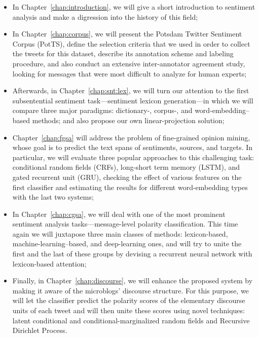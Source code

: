 \begin{itemize}
\item In Chapter~\ref{chap:introduction}, we will give a short
  introduction to sentiment analysis and make a digression into the
  history of this field;

\item In Chapter~\ref{chap:corpus}, we will present the Potsdam
  Twitter Sentiment Corpus (PotTS), define the selection criteria that
  we used in order to collect the tweets for this dataset, describe
  its annotation scheme and labeling procedure, and also conduct an
  extensive inter-annotator agreement study, looking for messages that
  were most difficult to analyze for human experts;

\item Afterwards, in Chapter~\ref{chap:snt:lex}, we will turn our
  attention to the first subsentential sentiment task---sentiment
  lexicon generation---in which we will compare three major paradigms:
  dictionary-, corpus-, and word-embedding--based methods; and also
  propose our own linear-projection solution;

\item Chapter~\ref{chap:fgsa} will address the problem of fine-grained
  opinion mining, whose goal is to predict the text spans of
  sentiments, sources, and targets.  In particular, we will evaluate
  three popular approaches to this challenging task: conditional
  random fields (CRFs), long-short term memory (LSTM), and gated
  recurrent unit (GRU), checking the effect of various features on the
  first classifier and estimating the results for different
  word-embedding types with the last two systems;

\item In Chapter~\ref{chap:cgsa}, we will deal with one of the most
  prominent sentiment analysis tasks---message-level polarity
  classification.  This time again we will juxtapose three main
  classes of methods: lexicon-based, machine-learning--based, and
  deep-learning ones, and will try to unite the first and the last of
  these groups by devising a recurrent neural network with
  lexicon-based attention;

\item Finally, in Chapter~\ref{chap:discourse}, we will enhance the
  proposed system by making it aware of the microblogs' discourse
  structure.  For this purpose, we will let the classifier predict the
  polarity scores of the elementary discourse units of each tweet and
  will then unite these scores using novel techniques: latent
  conditional and conditional-marginalized random fields and Recursive
  Dirichlet Process.
\end{itemize}
